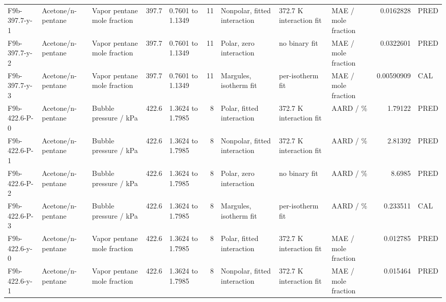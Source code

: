 \begin{landscape}
\begin{longtable}{L{1.9cm}L{2.5cm}L{2.1cm}L{1.6cm}L{1.6cm}rL{2.4cm}L{1.9cm}L{2.2cm}rL{1cm}}
F9b-\allowbreak{}397.7-\allowbreak{}y-\allowbreak{}1 & Acetone/\allowbreak{}n-\allowbreak{}pentane & Vapor pentane mole fraction & 397.7 & 0.7601 to 1.1349 & 11 & Nonpolar, fitted interaction & 372.7 K interaction fit & MAE /\allowbreak{} mole fraction & 0.0162828 & PRED \\
F9b-\allowbreak{}397.7-\allowbreak{}y-\allowbreak{}2 & Acetone/\allowbreak{}n-\allowbreak{}pentane & Vapor pentane mole fraction & 397.7 & 0.7601 to 1.1349 & 11 & Polar, zero interaction & no binary fit & MAE /\allowbreak{} mole fraction & 0.0322601 & PRED \\
F9b-\allowbreak{}397.7-\allowbreak{}y-\allowbreak{}3 & Acetone/\allowbreak{}n-\allowbreak{}pentane & Vapor pentane mole fraction & 397.7 & 0.7601 to 1.1349 & 11 & Margules, isotherm fit & per-\allowbreak{}isotherm fit & MAE /\allowbreak{} mole fraction & 0.00590909 & CAL \\
F9b-\allowbreak{}422.6-\allowbreak{}P-\allowbreak{}0 & Acetone/\allowbreak{}n-\allowbreak{}pentane & Bubble pressure /\allowbreak{} kPa & 422.6 & 1.3624 to 1.7985 & 8 & Polar, fitted interaction & 372.7 K interaction fit & AARD /\allowbreak{} \% & 1.79122 & PRED \\
F9b-\allowbreak{}422.6-\allowbreak{}P-\allowbreak{}1 & Acetone/\allowbreak{}n-\allowbreak{}pentane & Bubble pressure /\allowbreak{} kPa & 422.6 & 1.3624 to 1.7985 & 8 & Nonpolar, fitted interaction & 372.7 K interaction fit & AARD /\allowbreak{} \% & 2.81392 & PRED \\
F9b-\allowbreak{}422.6-\allowbreak{}P-\allowbreak{}2 & Acetone/\allowbreak{}n-\allowbreak{}pentane & Bubble pressure /\allowbreak{} kPa & 422.6 & 1.3624 to 1.7985 & 8 & Polar, zero interaction & no binary fit & AARD /\allowbreak{} \% & 8.6985 & PRED \\
F9b-\allowbreak{}422.6-\allowbreak{}P-\allowbreak{}3 & Acetone/\allowbreak{}n-\allowbreak{}pentane & Bubble pressure /\allowbreak{} kPa & 422.6 & 1.3624 to 1.7985 & 8 & Margules, isotherm fit & per-\allowbreak{}isotherm fit & AARD /\allowbreak{} \% & 0.233511 & CAL \\
F9b-\allowbreak{}422.6-\allowbreak{}y-\allowbreak{}0 & Acetone/\allowbreak{}n-\allowbreak{}pentane & Vapor pentane mole fraction & 422.6 & 1.3624 to 1.7985 & 8 & Polar, fitted interaction & 372.7 K interaction fit & MAE /\allowbreak{} mole fraction & 0.012785 & PRED \\
F9b-\allowbreak{}422.6-\allowbreak{}y-\allowbreak{}1 & Acetone/\allowbreak{}n-\allowbreak{}pentane & Vapor pentane mole fraction & 422.6 & 1.3624 to 1.7985 & 8 & Nonpolar, fitted interaction & 372.7 K interaction fit & MAE /\allowbreak{} mole fraction & 0.015464 & PRED \\

\end{longtable}
\end{landscape}
